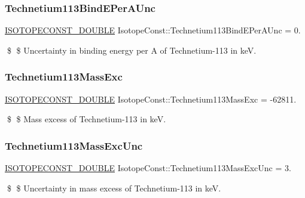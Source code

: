 \subsubsection{\texorpdfstring{Technetium113\+Bind\+E\+Per\+A\+Unc}{Technetium113BindEPerAUnc}}
{\footnotesize\ttfamily \mbox{\hyperlink{group___isotope_const-_macros_ga8f45a7272ce02c0b4c65c44636ed719a}{I\+S\+O\+T\+O\+P\+E\+C\+O\+N\+S\+T\+\_\+\+D\+O\+U\+B\+LE}} Isotope\+Const\+::\+Technetium113\+Bind\+E\+Per\+A\+Unc = 0.}

\$ \$ Uncertainty in binding energy per A of Technetium-\/113 in keV. \mbox{\label{group___isotope_const-_technetium-_tc113_ga928b09e4beee38486b15a4eaa99386b4}} 
\subsubsection{\texorpdfstring{Technetium113\+Mass\+Exc}{Technetium113MassExc}}
{\footnotesize\ttfamily \mbox{\hyperlink{group___isotope_const-_macros_ga8f45a7272ce02c0b4c65c44636ed719a}{I\+S\+O\+T\+O\+P\+E\+C\+O\+N\+S\+T\+\_\+\+D\+O\+U\+B\+LE}} Isotope\+Const\+::\+Technetium113\+Mass\+Exc = -\/62811.}

\$ \$ Mass excess of Technetium-\/113 in keV. \mbox{\label{group___isotope_const-_technetium-_tc113_gade511b58bae7b3a7b4ebfd560a13b4e9}} 
\subsubsection{\texorpdfstring{Technetium113\+Mass\+Exc\+Unc}{Technetium113MassExcUnc}}
{\footnotesize\ttfamily \mbox{\hyperlink{group___isotope_const-_macros_ga8f45a7272ce02c0b4c65c44636ed719a}{I\+S\+O\+T\+O\+P\+E\+C\+O\+N\+S\+T\+\_\+\+D\+O\+U\+B\+LE}} Isotope\+Const\+::\+Technetium113\+Mass\+Exc\+Unc = 3.}

\$ \$ Uncertainty in mass excess of Technetium-\/113 in keV. \mbox{\label{group___isotope_const-_technetium-_tc113_gae30b41b0dbb9a0b455908510dc2c15b6}} 
